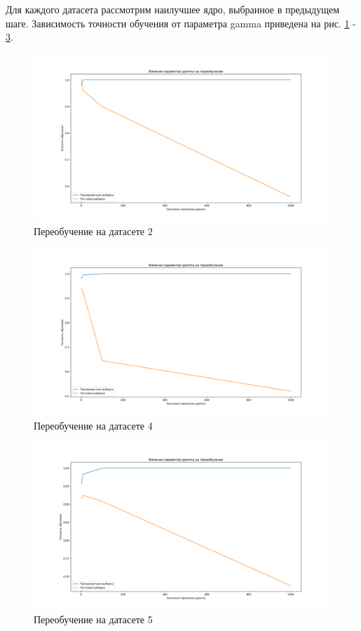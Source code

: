 \documentclass[a4paper,14pt]{article}
\begin{document}
Для каждого датасета рассмотрим наилучшее ядро, выбранное в предыдущем шаге. Зависимость точности обучения от параметра gamma приведена на рис. \ref{graph:task_2_gamma} - \ref{graph:task_5_gamma}.

\begin{figure}[H]
\includegraphics[width=\textwidth, keepaspectratio]{task2_gamma.png}
\caption{Переобучение на датасете 2}
\label{graph:task_2_gamma}
\end{figure}

\begin{figure}[H]
\includegraphics[width=\textwidth, keepaspectratio]{task4_gamma.png}
\caption{Переобучение на датасете 4}
\label{graph:task_4_gamma}
\end{figure}

\begin{figure}[H]
\includegraphics[width=\textwidth, keepaspectratio]{task5_gamma.png}
\caption{Переобучение на датасете 5}
\label{graph:task_5_gamma}
\end{figure}
\end{document}
